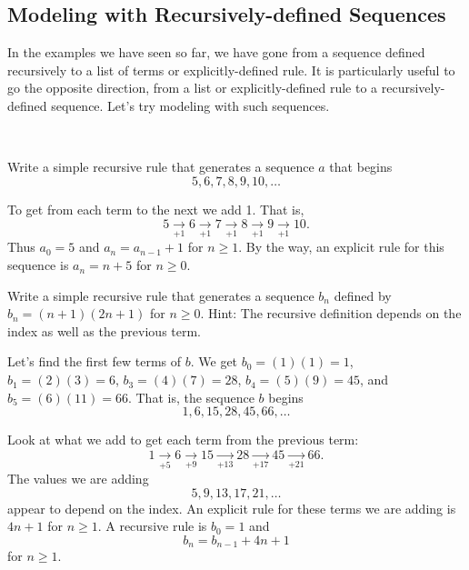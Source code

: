
\newcommand{\subntr}{Modeling with Recursively-defined Sequences}
\subsection{\subntr}
\label{sub_next_term_recursive}

In the examples we have seen so far, we have gone from a sequence defined recursively  to a list of terms or explicitly-defined rule.  It is particularly useful to go the opposite direction, from a list or explicitly-defined rule to a recursively-defined sequence.  Let's try modeling with such sequences.

\begin{exam}
\label{exam_write_rec_from_list}
~    
    \begin{apart}
        \item Write a simple recursive rule that generates a sequence $a$ that begins
        $$5, 6, 7, 8, 9, 10, \ldots$$
            \begin{soln}
                To get from each term to the next we add 1. That is,         
                    $$5 \xrightarrow[+ 1]{} 6 \xrightarrow[+ 1]{} 7 \xrightarrow[+ 1]{} 8 \xrightarrow[+ 1]{} 9 \xrightarrow[+ 1]{} 10.$$
                Thus $a_0=5$ and $a_n=a_{n-1}+1$ for $n \ge 1$.
                By the way, an explicit rule for this sequence is $a_n=n+5$ for $n\ge 0$.
            \end{soln}

        \item Write a simple recursive rule that generates a sequence $b_n$ defined by $b_n=(n+1)(2n+1)$ for $n \ge 0$. Hint: The recursive definition depends on the index as well as the previous term.  
        \begin{soln}
            Let's find the first few terms of $b$. We get $b_0 = (1)(1) = 1$, 
            $b_1 = (2)(3) = 6$,
            $b_3 = (4)(7) = 28$,
            $b_4 = (5)(9) = 45$, and
            $b_5 = (6)(11) = 66$.  
            That is, the sequence $b$ begins $$1, 6, 15, 28, 45, 66, \ldots $$  

            Look at what we add to get each term from the previous term:
            $$1 \xrightarrow[+ 5]{} 6
            \xrightarrow[+ 9]{} 15
            \xrightarrow[+ 13]{} 28
            \xrightarrow[+ 17]{} 45
            \xrightarrow[+ 21]{} 66.$$
            The values we are adding 
                $$5,9,13,17,21,\ldots$$
            appear to depend on the index.  An explicit rule for these terms we are adding is $4n+1$ for $n \ge 1$.  A recursive rule is $b_0=1$ and $$b_n=b_{n-1}+4n+1$$ for $n \ge 1$.  
        \end{soln}
    \end{apart}   
\end{exam}

